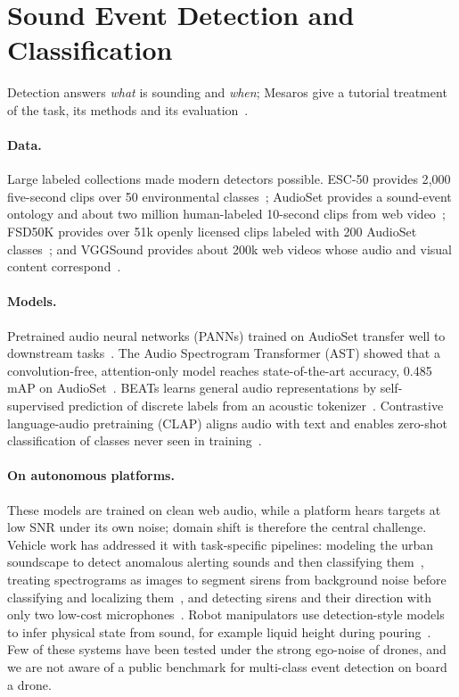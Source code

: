 \section{Sound Event Detection and Classification}
\label{sec:sed}

Detection answers \emph{what} is sounding and \emph{when}; Mesaros \etal give a tutorial treatment of the task, its methods and its evaluation~\cite{mesaros2021tutorial}.

\paragraph{Data.}
Large labeled collections made modern detectors possible.
ESC-50 provides 2{,}000 five-second clips over 50 environmental classes~\cite{piczak2015esc}; AudioSet provides a sound-event ontology and about two million human-labeled 10-second clips from web video~\cite{gemmeke2017audioset}; FSD50K provides over 51k openly licensed clips labeled with 200 AudioSet classes~\cite{fonseca2022fsd50k}; and VGGSound provides about 200k web videos whose audio and visual content correspond~\cite{chen2020vggsound}.

\paragraph{Models.}
Pretrained audio neural networks (PANNs) trained on AudioSet transfer well to downstream tasks~\cite{kong2020panns}.
The Audio Spectrogram Transformer (AST) showed that a convolution-free, attention-only model reaches state-of-the-art accuracy, 0.485 mAP on AudioSet~\cite{gong2021ast}.
BEATs learns general audio representations by self-supervised prediction of discrete labels from an acoustic tokenizer~\cite{chen2023beats}.
Contrastive language-audio pretraining (CLAP) aligns audio with text and enables zero-shot classification of classes never seen in training~\cite{elizalde2023clap}.

\paragraph{On autonomous platforms.}
These models are trained on clean web audio, while a platform hears targets at low SNR under its own noise; domain shift is therefore the central challenge.
Vehicle work has addressed it with task-specific pipelines: modeling the urban soundscape to detect anomalous alerting sounds and then classifying them~\cite{marchegiani2017urban}, treating spectrograms as images to segment sirens from background noise before classifying and localizing them~\cite{marchegiani2022sirens}, and detecting sirens and their direction with only two low-cost microphones~\cite{sun2021siren}.
Robot manipulators use detection-style models to infer physical state from sound, for example liquid height during pouring~\cite{liang2019pouring}.
Few of these systems have been tested under the strong ego-noise of drones, and we are not aware of a public benchmark for multi-class event detection on board a drone.
